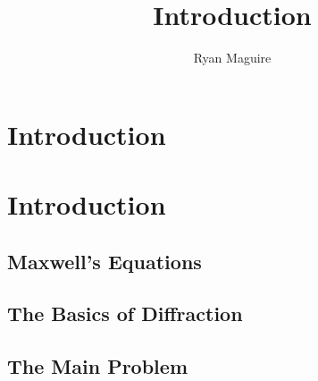 \documentclass[crop=false,class=book,oneside]{standalone}
\begin{document}
    \ifx\ifplanetdiff\undefined
        \newif\ifintro
        \title{Introduction}
        \author{Ryan Maguire}
        \date{\vspace{-5ex}}
        \maketitle
        \tableofcontents
        \clearpage
        \chapter*{Introduction}
        \setcounter{chapter}{1}
    \else
        \chapter{Introduction}
    \fi
    \section{Maxwell's Equations}
    \section{The Basics of Diffraction}
    \section{The Main Problem}
\end{document}
